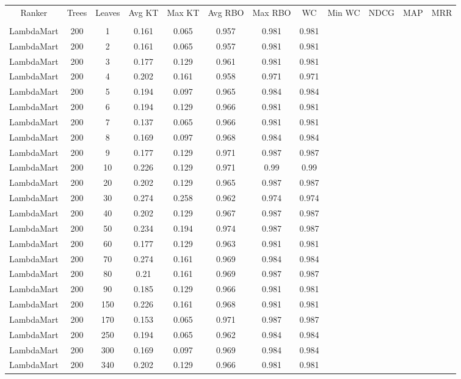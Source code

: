 \begin{longtable}{*{12}{c}}
Ranker & Trees & Leaves & Avg KT & Max KT & Avg RBO & Max RBO & WC & Min WC & NDCG & MAP & MRR  \\\\ 
LambdaMart & 200 & 1 & 0.161 & 0.065 & 0.957 & 0.981 & 0.981 \\ 
LambdaMart & 200 & 2 & 0.161 & 0.065 & 0.957 & 0.981 & 0.981 \\ 
LambdaMart & 200 & 3 & 0.177 & 0.129 & 0.961 & 0.981 & 0.981 \\ 
LambdaMart & 200 & 4 & 0.202 & 0.161 & 0.958 & 0.971 & 0.971 \\ 
LambdaMart & 200 & 5 & 0.194 & 0.097 & 0.965 & 0.984 & 0.984 \\ 
LambdaMart & 200 & 6 & 0.194 & 0.129 & 0.966 & 0.981 & 0.981 \\ 
LambdaMart & 200 & 7 & 0.137 & 0.065 & 0.966 & 0.981 & 0.981 \\ 
LambdaMart & 200 & 8 & 0.169 & 0.097 & 0.968 & 0.984 & 0.984 \\ 
LambdaMart & 200 & 9 & 0.177 & 0.129 & 0.971 & 0.987 & 0.987 \\ 
LambdaMart & 200 & 10 & 0.226 & 0.129 & 0.971 & 0.99 & 0.99 \\ 
LambdaMart & 200 & 20 & 0.202 & 0.129 & 0.965 & 0.987 & 0.987 \\ 
LambdaMart & 200 & 30 & 0.274 & 0.258 & 0.962 & 0.974 & 0.974 \\ 
LambdaMart & 200 & 40 & 0.202 & 0.129 & 0.967 & 0.987 & 0.987 \\ 
LambdaMart & 200 & 50 & 0.234 & 0.194 & 0.974 & 0.987 & 0.987 \\ 
LambdaMart & 200 & 60 & 0.177 & 0.129 & 0.963 & 0.981 & 0.981 \\ 
LambdaMart & 200 & 70 & 0.274 & 0.161 & 0.969 & 0.984 & 0.984 \\ 
LambdaMart & 200 & 80 & 0.21 & 0.161 & 0.969 & 0.987 & 0.987 \\ 
LambdaMart & 200 & 90 & 0.185 & 0.129 & 0.966 & 0.981 & 0.981 \\ 
LambdaMart & 200 & 150 & 0.226 & 0.161 & 0.968 & 0.981 & 0.981 \\ 
LambdaMart & 200 & 170 & 0.153 & 0.065 & 0.971 & 0.987 & 0.987 \\ 
LambdaMart & 200 & 250 & 0.194 & 0.065 & 0.962 & 0.984 & 0.984 \\ 
LambdaMart & 200 & 300 & 0.169 & 0.097 & 0.969 & 0.984 & 0.984 \\ 
LambdaMart & 200 & 340 & 0.202 & 0.129 & 0.966 & 0.981 & 0.981 \\ 

\end{longtable}
